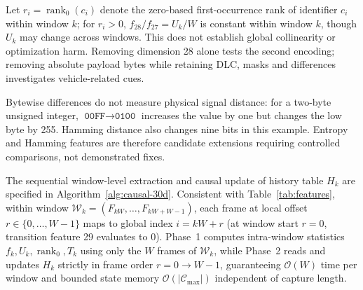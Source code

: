 \documentclass[12pt, a4paper, reqno, oneside]{book}
\begin{document}
Let $r_i = \operatorname{rank}_0(c_i)$ denote the zero-based first-occurrence rank of identifier $c_i$ within window $k$; for $r_i>0$, $f_{28}/f_{27}=U_k/W$ is constant within window $k$, though $U_k$ may change across windows. This does not establish global collinearity or optimization harm. Removing dimension 28 alone tests the second encoding; removing absolute payload bytes while retaining DLC, masks and differences investigates vehicle-related cues.

Bytewise differences do not measure physical signal distance: for a two-byte unsigned integer, $\texttt{00FF}\rightarrow\texttt{0100}$ increases the value by one but changes the low byte by 255. Hamming distance also changes nine bits in this example. Entropy and Hamming features are therefore candidate extensions requiring controlled comparisons, not demonstrated fixes.

The sequential window-level extraction and causal update of history table $H_k$ are specified in Algorithm~\ref{alg:causal-30d}. Consistent with Table~\ref{tab:features}, within window $\mathcal{W}_k=(F_{kW},\ldots,F_{kW+W-1})$, each frame at local offset $r \in \{0,\ldots,W-1\}$ maps to global index $i = kW + r$ (at window start $r=0$, transition feature 29 evaluates to $0$). Phase~1 computes intra-window statistics $f_k, U_k, \operatorname{rank}_0, T_k$ using only the $W$ frames of $\mathcal{W}_k$, while Phase~2 reads and updates $H_k$ strictly in frame order $r=0 \to W-1$, guaranteeing $\mathcal{O}(W)$ time per window and bounded state memory $\mathcal{O}(|\mathcal{C}_{\max}|)$ independent of capture length.
\end{document}
